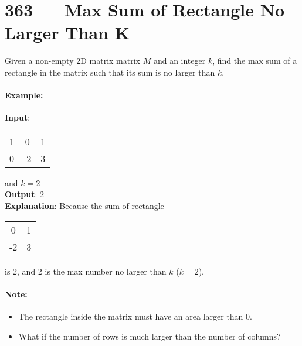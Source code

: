 \section{363 --- Max Sum of Rectangle No Larger Than K}
Given a non-empty 2D matrix matrix $ M $ and an integer $ k $, find the max sum of a rectangle in the matrix such that its sum is no larger than $ k $.

\paragraph{Example:}

\begin{flushleft}
\textbf{Input}: 
\begin{table}[H]
\begin{tabular}{ccc}
1 & 0 & 1\\
0 & -2 & 3
\end{tabular}
\end{table}
and $ k=2 $
\\
\textbf{Output}: 2 
\\
\textbf{Explanation}: Because the sum of rectangle 
\begin{table}[H]
\begin{tabular}{cc}
0 & 1\\
-2 & 3
\end{tabular}
\end{table}
is 2, and 2 is the max number no larger than $ k $ ($ k = 2 $).
\end{flushleft}

\paragraph{Note:}

\begin{itemize}
\item The rectangle inside the matrix must have an area larger than 0.
\item What if the number of rows is much larger than the number of columns?
\end{itemize}

